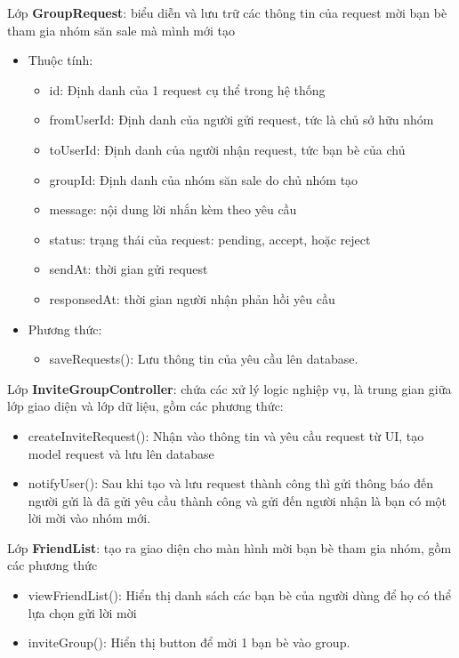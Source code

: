 \documentclass[../DoAn.tex]{subfiles}
\begin{document}
Lớp \textbf{GroupRequest}: biểu diễn và lưu trữ các thông tin của request mời bạn bè tham gia nhóm săn sale mà mình mới tạo
    \begin{itemize}
        \item Thuộc tính:
            \begin{itemize}
                \item id: Định danh của 1 request cụ thể trong hệ thống
                \item fromUserId: Định danh của người gửi request, tức là chủ sở hữu nhóm
                \item toUserId: Định danh của người nhận request, tức bạn bè  của chủ 
                \item groupId: Định danh của nhóm săn sale do chủ nhóm tạo
                \item message: nội dung lời nhắn kèm theo yêu cầu 
                \item status: trạng thái của request: pending, accept, hoặc reject
                \item sendAt: thời gian gửi request
                \item responsedAt: thời gian người nhận phản hồi yêu cầu
            \end{itemize}
        \item Phương thức:
            \begin{itemize}
                \item saveRequests(): Lưu thông tin của yêu cầu lên database.
            \end{itemize}
    \end{itemize}

Lớp \textbf{InviteGroupController}: chứa các xử lý logic nghiệp vụ, là trung gian giữa lớp giao diện và lớp dữ liệu, gồm các phương thức: 
   \begin{itemize}
                \item createInviteRequest(): Nhận vào thông tin và yêu cầu request từ UI, tạo model request và lưu lên database
                \item notifyUser(): Sau khi tạo và lưu request thành công thì gửi thông báo đến người gửi là đã gửi yêu cầu thành công và gửi đến người nhận là bạn có một lời mời vào nhóm mới.
    \end{itemize}

Lớp \textbf{FriendList}: tạo ra giao diện cho màn hình mời bạn bè tham gia nhóm, gồm các phương thức
      \begin{itemize}
                \item viewFriendList(): Hiển thị danh sách các bạn bè của người dùng để họ có thể lựa chọn gửi lời mời
                \item inviteGroup(): Hiển thị button để mời 1 bạn bè vào group.
    \end{itemize}
\end{document}
